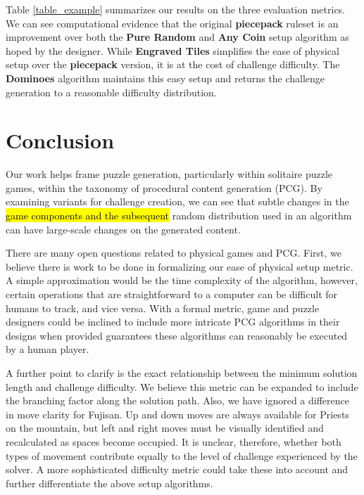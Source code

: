 \documentclass[journal]{IEEEtran}
\begin{document}
Table \ref{table_example} summarizes our results on the three evaluation metrics. We can see computational evidence that the original {\bf piecepack} ruleset is an improvement over both the {\bf Pure Random} and {\bf Any Coin} setup algorithm as hoped by the designer. While {\bf Engraved Tiles} simplifies the ease of physical setup over the {\bf piecepack} version, it is at the cost of challenge difficulty. The {\bf Dominoes} algorithm maintains this easy setup and returns the challenge generation to a reasonable difficulty distribution.



\section{Conclusion}   \label{sec:Conclusion}

\noindent
Our work helps frame puzzle generation, particularly within solitaire puzzle games, within the taxonomy of procedural content generation (PCG). By examining variants for challenge creation, we can see that subtle changes in the \hl{game components and the subsequent} random distribution used in an algorithm can have large-scale changes on the generated content.

There are many open questions related to physical games and PCG. First, we believe there is work to be done in formalizing our ease of physical setup metric. A simple approximation would be the time complexity of the algorithm, however, certain operations that are straightforward to a computer can be difficult for humans to track, and vice versa. With a formal metric, game and puzzle designers could be inclined to include more intricate PCG algorithms in their designs when provided guarantees these algorithms can reasonably be executed by a human player.

A further point to clarify is the exact relationship between the minimum solution length and challenge difficulty. We believe this metric can be expanded to include the branching factor along the solution path. Also, we have ignored a difference in move clarity for Fujisan. Up and down moves are always available for Priests on the mountain, but left and right moves must be visually identified and recalculated as spaces become occupied. It is unclear, therefore, whether both types of movement contribute equally to the level of challenge experienced by the solver. A more sophisticated difficulty metric could take these into account and further differentiate the above setup algorithms.
\end{document}
